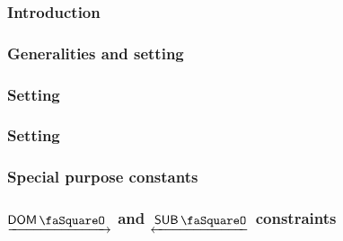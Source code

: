 
\subsubsection{Introduction}                                          \label{hub: generalities: revert: intro}                                   
\subsubsection{Generalities and setting \cnWillRev{}}                 \label{hub: generalities: revert: will revert}                             
\subsubsection{Setting \cnSelfRev{}}                                  \label{hub: generalities: revert: self revert}                             
\subsubsection{Setting \cnGetsRev{}}                                  \label{hub: generalities: revert: gets reverted}                           
\subsubsection{Special purpose constants}                             \label{hub: generalities: revert: constants}                               
\subsubsection{$\domStamp$ and $\subStamp$ constraints}               \label{hub: generalities: revert: dom and sub stamps}                      
